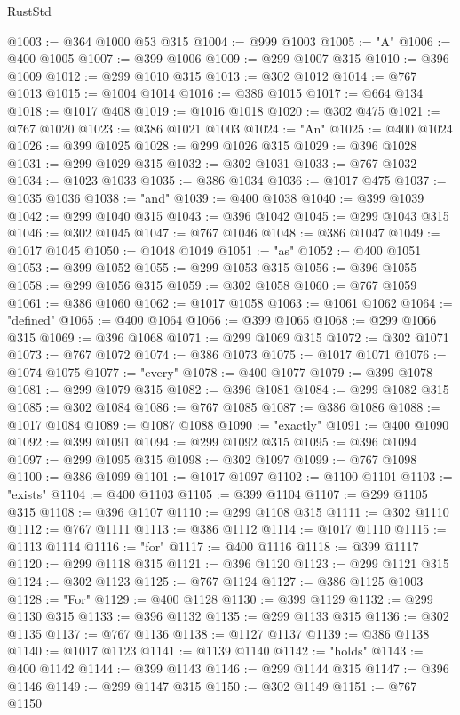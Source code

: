 \begin{lexlean}{RustStd}
\begin{coremodule}
@1003 := @364 @1000 @53 @315
@1004 := @999 @1003
@1005 := "A"
@1006 := @400 @1005
@1007 := @399 @1006
@1009 := @299 @1007 @315
@1010 := @396 @1009
@1012 := @299 @1010 @315
@1013 := @302 @1012
@1014 := @767 @1013
@1015 := @1004 @1014
@1016 := @386 @1015
@1017 := @664 @134
@1018 := @1017 @408
@1019 := @1016 @1018
@1020 := @302 @475
@1021 := @767 @1020
@1023 := @386 @1021 @1003
@1024 := "An"
@1025 := @400 @1024
@1026 := @399 @1025
@1028 := @299 @1026 @315
@1029 := @396 @1028
@1031 := @299 @1029 @315
@1032 := @302 @1031
@1033 := @767 @1032
@1034 := @1023 @1033
@1035 := @386 @1034
@1036 := @1017 @475
@1037 := @1035 @1036
@1038 := "and"
@1039 := @400 @1038
@1040 := @399 @1039
@1042 := @299 @1040 @315
@1043 := @396 @1042
@1045 := @299 @1043 @315
@1046 := @302 @1045
@1047 := @767 @1046
@1048 := @386 @1047
@1049 := @1017 @1045
@1050 := @1048 @1049
@1051 := "as"
@1052 := @400 @1051
@1053 := @399 @1052
@1055 := @299 @1053 @315
@1056 := @396 @1055
@1058 := @299 @1056 @315
@1059 := @302 @1058
@1060 := @767 @1059
@1061 := @386 @1060
@1062 := @1017 @1058
@1063 := @1061 @1062
@1064 := "defined"
@1065 := @400 @1064
@1066 := @399 @1065
@1068 := @299 @1066 @315
@1069 := @396 @1068
@1071 := @299 @1069 @315
@1072 := @302 @1071
@1073 := @767 @1072
@1074 := @386 @1073
@1075 := @1017 @1071
@1076 := @1074 @1075
@1077 := "every"
@1078 := @400 @1077
@1079 := @399 @1078
@1081 := @299 @1079 @315
@1082 := @396 @1081
@1084 := @299 @1082 @315
@1085 := @302 @1084
@1086 := @767 @1085
@1087 := @386 @1086
@1088 := @1017 @1084
@1089 := @1087 @1088
@1090 := "exactly"
@1091 := @400 @1090
@1092 := @399 @1091
@1094 := @299 @1092 @315
@1095 := @396 @1094
@1097 := @299 @1095 @315
@1098 := @302 @1097
@1099 := @767 @1098
@1100 := @386 @1099
@1101 := @1017 @1097
@1102 := @1100 @1101
@1103 := "exists"
@1104 := @400 @1103
@1105 := @399 @1104
@1107 := @299 @1105 @315
@1108 := @396 @1107
@1110 := @299 @1108 @315
@1111 := @302 @1110
@1112 := @767 @1111
@1113 := @386 @1112
@1114 := @1017 @1110
@1115 := @1113 @1114
@1116 := "for"
@1117 := @400 @1116
@1118 := @399 @1117
@1120 := @299 @1118 @315
@1121 := @396 @1120
@1123 := @299 @1121 @315
@1124 := @302 @1123
@1125 := @767 @1124
@1127 := @386 @1125 @1003
@1128 := "For"
@1129 := @400 @1128
@1130 := @399 @1129
@1132 := @299 @1130 @315
@1133 := @396 @1132
@1135 := @299 @1133 @315
@1136 := @302 @1135
@1137 := @767 @1136
@1138 := @1127 @1137
@1139 := @386 @1138
@1140 := @1017 @1123
@1141 := @1139 @1140
@1142 := "holds"
@1143 := @400 @1142
@1144 := @399 @1143
@1146 := @299 @1144 @315
@1147 := @396 @1146
@1149 := @299 @1147 @315
@1150 := @302 @1149
@1151 := @767 @1150

\end{coremodule}
\end{lexlean}
